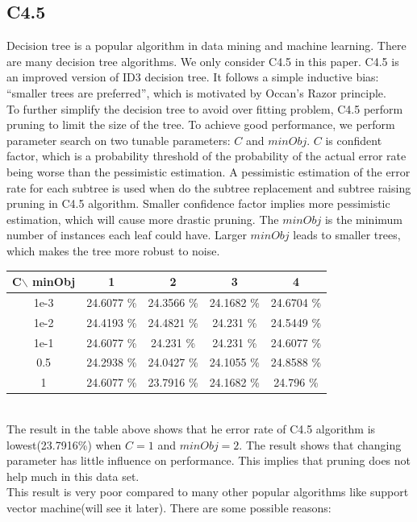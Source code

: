 \documentclass[a4paper,11pt]{article}
\begin{document}
\subsection{C4.5}
Decision tree is a popular algorithm in data mining and machine learning. There are many decision tree algorithms. We only consider C4.5 in this paper. C4.5 is an improved version of ID3 decision tree. It follows a simple inductive bias: ``smaller trees are preferred'', which is motivated by Occan's Razor principle.\\
To further simplify the decision tree to avoid over fitting problem, C4.5 perform pruning to limit the size of the tree. To achieve good performance, we perform parameter search on two tunable parameters: $C$ and $minObj$. $C$ is confident factor, which is a probability threshold of the probability of the actual error rate being worse than the pessimistic estimation\cite{morgan.kaufmann}. A pessimistic estimation of the error rate for each subtree is used when do the subtree replacement and subtree raising pruning in C4.5 algorithm. Smaller confidence factor implies more pessimistic estimation, which will cause more drastic pruning. The $minObj$ is the minimum number of instances each leaf could have. Larger $minObj$ leads to smaller trees, which makes the tree more robust to noise.
\vspace{0.5cm}\\
\begin{tabular}{c|c c c c}
C$\backslash$ minObj	&1		&2		&3		&4\\
\hline \hline
1e-3 	&24.6077 \%	&24.3566 \%	&24.1682 \%	 &24.6704 \%\\
1e-2	&24.4193 \%	 &24.4821 \%	&24.231  \%	 &24.5449 \%\\
1e-1	&24.6077 \%	&24.231  \%	&24.231  \%	 &24.6077 \%\\
0.5 &24.2938 \%     &24.0427 \% &24.1055 \%  &24.8588 \%\\
1	&24.6077 \%	    &23.7916 \%	&24.1682 \%	 &24.796  \%\\
\end{tabular}
\vspace{0.5cm}\\
The result in the table above shows that he error rate of C4.5 algorithm is lowest(23.7916\%) when $C=1$ and $minObj=2$. The result shows that changing parameter has little influence on performance. This implies that pruning does not help much in this data set.\\
This result is very poor compared to many other popular algorithms like support vector machine(will see it later). There are some possible reasons:\\
\end{document}
